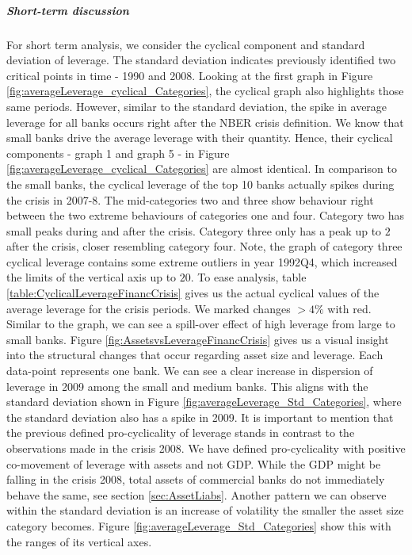 \documentclass[12pt, a4paper]{article} %
\begin{document}
\subparagraph{Short-term discussion} 
For short term analysis, we consider the cyclical component and standard deviation of leverage. The standard deviation indicates previously identified two critical points in time - 1990 and 2008. Looking at the first graph in Figure \ref{fig:averageLeverage_cyclical_Categories}, the cyclical graph also highlights those same periods. However, similar to the standard deviation, the spike in average leverage for all banks occurs right after the NBER crisis definition. We know that small banks drive the average leverage with their quantity. Hence, their cyclical components - graph 1 and graph 5 - in Figure \ref{fig:averageLeverage_cyclical_Categories} are almost identical. In comparison to the small banks, the cyclical leverage of the top 10 banks actually spikes during the crisis in 2007-8. The mid-categories two and three show behaviour right between the two extreme behaviours of categories one and four. Category two has small peaks during and after the crisis. Category three only has a peak up to $2$ after the crisis, closer resembling category four. Note, the graph of category three cyclical leverage contains some extreme outliers in year 1992Q4, which increased the limits of the vertical axis up to $20$. To ease analysis, table \ref{table:CyclicalLeverageFinancCrisis} gives us the actual cyclical values of the average leverage for the crisis periods. We marked changes $>4\%$ with red. Similar to the graph, we can see a spill-over effect of high leverage from large to small banks. Figure \ref{fig:AssetsvsLeverageFinancCrisis} gives us a visual insight into the structural changes that occur regarding asset size and leverage. Each data-point represents one bank. We can see a clear increase in dispersion of leverage in 2009 among the small and medium banks. This aligns with the standard deviation shown in Figure \ref{fig:averageLeverage_Std_Categories}, where the standard deviation also has a spike in 2009. It is important to mention that the previous defined pro-cyclicality of leverage stands in contrast to the observations made in the crisis 2008. We have defined pro-cyclicality with positive co-movement of leverage with assets and not GDP. While the GDP might be falling in the crisis 2008, total assets of commercial banks do not immediately behave the same, see section \ref{sec:AssetLiabs}.  
Another pattern we can observe within the standard deviation is an increase of volatility the smaller the asset size category becomes. Figure \ref{fig:averageLeverage_Std_Categories} show this with the ranges of its vertical axes.   
\end{document}

